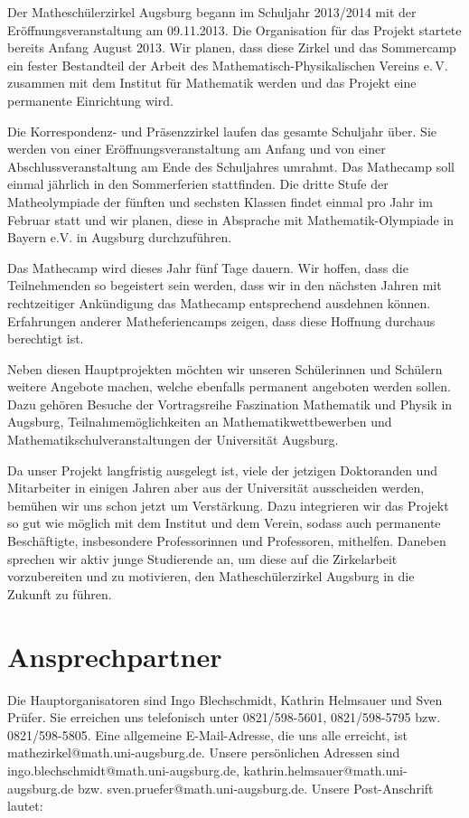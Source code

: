 \documentclass[12pt]{zettel}
\begin{document}
Der Matheschülerzirkel Augsburg begann im Schuljahr 2013/2014 mit der
Er\-öf\-fnungs\-ver\-an\-stal\-tung am 09.11.2013. Die Organisation für das Projekt
startete bereits Anfang August 2013. Wir planen, dass diese Zirkel und
das Sommercamp ein fester Bestandteil der Arbeit des
Mathematisch-Physikalischen Vereins e.\,V. zusammen mit dem Institut für
Mathematik werden und das Projekt eine permanente Einrichtung wird.

Die Korrespondenz- und Präsenzzirkel laufen
das gesamte Schuljahr über. Sie werden von einer
Eröffnungsveranstaltung am Anfang und von einer
Abschlussveranstaltung am Ende des Schuljahres umrahmt. Das Mathecamp soll
einmal jährlich in den Sommerferien stattfinden. Die dritte Stufe der
Matheolympiade der fünften und sechsten Klassen findet einmal pro Jahr
im Februar statt und wir planen, diese in
Absprache mit Mathematik-Olympiade in Bayern e.V. in Augsburg
durchzuführen.

Das Mathecamp wird dieses Jahr fünf Tage dauern. Wir hoffen, dass die
Teilnehmenden so begeistert sein werden,
dass wir in den nächsten Jahren mit rechtzeitiger Ankündigung das
Mathecamp entsprechend ausdehnen können. Erfahrungen anderer
Matheferiencamps zeigen, dass diese Hoffnung durchaus berechtigt ist.

Neben diesen Hauptprojekten möchten wir unseren Schülerinnen und
Schülern weitere Angebote machen, welche ebenfalls permanent angeboten
werden sollen. Dazu gehören Besuche der Vortragsreihe Faszination
Mathematik und Physik in Augsburg, Teilnahmemöglichkeiten
an Mathematikwettbewerben und Mathematikschulveranstaltungen der Universität Augsburg.

Da unser Projekt langfristig ausgelegt ist, viele der jetzigen Doktoranden und
Mitarbeiter in einigen Jahren aber aus der Universität ausscheiden werden,
bemühen wir uns schon jetzt um Verstärkung.
Dazu integrieren wir das Projekt so gut wie möglich mit
dem Institut und dem Verein, sodass auch permanente Beschäftigte,
insbesondere Professorinnen und Professoren, mithelfen. Daneben sprechen wir
aktiv junge Studierende an, um diese auf die Zirkelarbeit
vorzubereiten und zu motivieren, den Matheschülerzirkel
Augsburg in die Zukunft zu führen.


\section{Ansprechpartner}

Die Hauptorganisatoren sind Ingo Blechschmidt, Kathrin Helmsauer und Sven
Prüfer. Sie erreichen uns telefonisch unter 0821/598-5601, 0821/598-5795 bzw.
0821/598-5805. Eine allgemeine E-Mail-Adresse, die uns alle erreicht, ist
\textsf{mathezirkel@math.uni-augsburg.de}. Unsere persönlichen Adressen sind
\textsf{ingo.blechschmidt@math.uni-augsburg.de},
\textsf{kathrin.helmsauer@math.uni-augsburg.de} bzw.
\textsf{sven.pruefer@math.uni-augsburg.de}. Unsere Post-Anschrift lautet:
\end{document}
